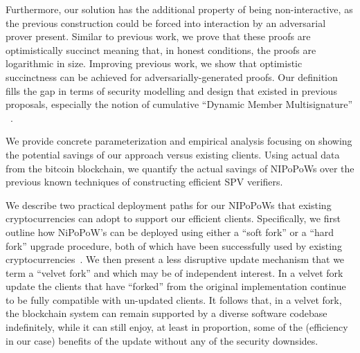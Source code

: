 Furthermore, our solution has the additional property of being non-interactive,
as the previous construction could be forced into interaction by an adversarial
prover present. Similar to previous work, we prove that these proofs are
optimistically succinct meaning that, in honest conditions, the proofs are
logarithmic in size. Improving previous work, we show that optimistic
succinctness can be achieved for adversarially-generated proofs. Our definition
fills the gap in terms of security modelling and design that existed in previous
proposals, especially the notion of cumulative ``Dynamic Member Multisignature''
~\cite{sidechains}.

We provide concrete parameterization and empirical analysis focusing on showing
the potential savings of our approach versus existing clients. Using actual data
from the bitcoin blockchain, we quantify the actual savings of NIPoPoWs over the
previous known techniques of constructing efficient SPV verifiers.

We describe two practical deployment paths for our NIPoPoWs that existing
cryptocurrencies can adopt to support our efficient clients. Specifically, we
first outline how NiPoPoW's can be deployed using either a ``soft fork'' or a
``hard fork'' upgrade procedure, both of which have been successfully used by
existing cryptocurrencies~\cite{sok}. We then present a less disruptive update
mechanism that we term a ``velvet fork'' and which may be of independent
interest. In a velvet fork update the clients that have ``forked'' from the
original implementation continue to be fully compatible with un-updated clients.
It follows that, in a velvet fork, the blockchain system can remain supported by
a diverse software codebase indefinitely, while it can still enjoy, at least in
proportion, some of the (efficiency in our case) benefits of the update without
any of the security downsides.

